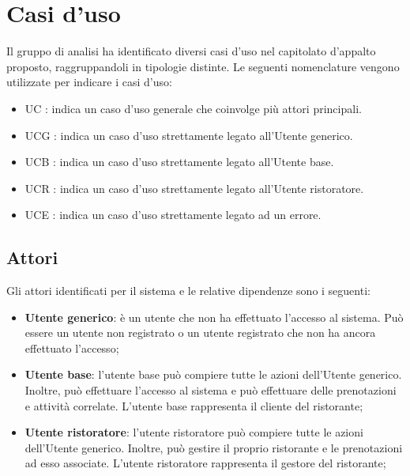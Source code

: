 \section{Casi d'uso}

Il gruppo di analisi ha identificato diversi casi d'uso nel capitolato d'appalto proposto, raggruppandoli in tipologie distinte. 
Le seguenti nomenclature vengono utilizzate per indicare i casi d'uso:

\begin{itemize}
	\item UC : indica un caso d'uso generale che coinvolge più attori principali.
	\item UCG : indica un caso d'uso strettamente legato all'Utente generico.
	\item UCB : indica un caso d'uso strettamente legato all'Utente base.
	\item UCR : indica un caso d'uso strettamente legato all'Utente ristoratore.
	\item UCE : indica un caso d'uso strettamente legato ad un errore.
\end{itemize}

\subsection{Attori}

Gli attori identificati per il sistema e le relative dipendenze sono i seguenti:
\begin{itemize}
	\item \textbf{Utente generico}: è un utente che non ha effettuato l'accesso al
	      sistema. Può essere un utente non registrato o un utente registrato che non ha
	      ancora effettuato l'accesso;

	\item \textbf{Utente base}: l'utente base può compiere tutte le azioni
	      dell'Utente generico. Inoltre, può effettuare l'accesso al sistema e può
	      effettuare delle prenotazioni e attività correlate. L'utente base rappresenta
	      il cliente del ristorante;

	\item \textbf{Utente ristoratore}: l'utente ristoratore può compiere tutte le
	      azioni dell'Utente generico. Inoltre, può gestire il proprio ristorante e le
	      prenotazioni ad esso associate. L'utente ristoratore rappresenta il gestore del
	      ristorante;
\end{itemize}
